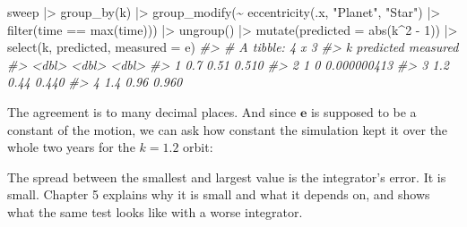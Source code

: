 \documentclass[
  10.5pt,
  letterpaper,
]{scrbook}
\newenvironment{Shaded}{\begin{snugshade}}{\end{snugshade}}
\newcommand{\AttributeTok}[1]{\textcolor[rgb]{0.00,0.00,0.00}{#1}}
\newcommand{\CommentTok}[1]{\textcolor[rgb]{0.00,0.00,0.00}{\textit{#1}}}
\newcommand{\DecValTok}[1]{\textcolor[rgb]{0.00,0.00,0.00}{#1}}
\newcommand{\FloatTok}[1]{\textcolor[rgb]{0.00,0.00,0.00}{#1}}
\newcommand{\FunctionTok}[1]{\textcolor[rgb]{0.00,0.00,0.00}{#1}}
\newcommand{\NormalTok}[1]{\textcolor[rgb]{0.00,0.00,0.00}{#1}}
\newcommand{\OtherTok}[1]{\textcolor[rgb]{0.00,0.00,0.00}{#1}}
\newcommand{\SpecialCharTok}[1]{\textcolor[rgb]{0.00,0.00,0.00}{#1}}
\newcommand{\StringTok}[1]{\textcolor[rgb]{0.00,0.00,0.00}{#1}}
\theoremstyle{plain}
\theoremstyle{remark}
\begin{document}
\begin{Shaded}
\begin{Highlighting}[]
\NormalTok{sweep }\SpecialCharTok{|\textgreater{}}
  \FunctionTok{group\_by}\NormalTok{(k) }\SpecialCharTok{|\textgreater{}}
  \FunctionTok{group\_modify}\NormalTok{(}\SpecialCharTok{\textasciitilde{}} \FunctionTok{eccentricity}\NormalTok{(.x, }\StringTok{"Planet"}\NormalTok{, }\StringTok{"Star"}\NormalTok{) }\SpecialCharTok{|\textgreater{}}
                 \FunctionTok{filter}\NormalTok{(time }\SpecialCharTok{==} \FunctionTok{max}\NormalTok{(time))) }\SpecialCharTok{|\textgreater{}}
  \FunctionTok{ungroup}\NormalTok{() }\SpecialCharTok{|\textgreater{}}
  \FunctionTok{mutate}\NormalTok{(}\AttributeTok{predicted =} \FunctionTok{abs}\NormalTok{(k}\SpecialCharTok{\^{}}\DecValTok{2} \SpecialCharTok{{-}} \DecValTok{1}\NormalTok{)) }\SpecialCharTok{|\textgreater{}}
  \FunctionTok{select}\NormalTok{(k, predicted, }\AttributeTok{measured =}\NormalTok{ e)}
\CommentTok{\#\textgreater{} \# A tibble: 4 x 3}
\CommentTok{\#\textgreater{}       k predicted    measured}
\CommentTok{\#\textgreater{}   \textless{}dbl\textgreater{}     \textless{}dbl\textgreater{}       \textless{}dbl\textgreater{}}
\CommentTok{\#\textgreater{} 1   0.7      0.51 0.510      }
\CommentTok{\#\textgreater{} 2   1        0    0.000000413}
\CommentTok{\#\textgreater{} 3   1.2      0.44 0.440      }
\CommentTok{\#\textgreater{} 4   1.4      0.96 0.960}
\end{Highlighting}
\end{Shaded}

The agreement is to many decimal places. And since \(\mathbf{e}\) is
supposed to be a constant of the motion, we can ask how constant the
simulation kept it over the whole two years for the \(k = 1.2\) orbit:

\begin{Shaded}
\end{Shaded}

The spread between the smallest and largest value is the integrator's
error. It is small. Chapter 5 explains why it is small and what it
depends on, and shows what the same test looks like with a worse
integrator.
\end{document}

